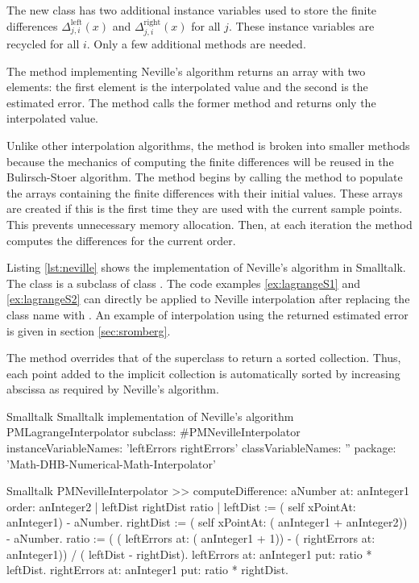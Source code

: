 The new class has two additional instance variables used to store
the finite differences $\Delta_{j,i}^{\mathop{
left}}\left(x\right)$ and $\Delta_{j,i}^{\mathop{
right}}\left(x\right)$ for all $j$.
These instance variables are recycled for all $i$.
Only a few additional methods are needed.

The method  implementing Neville's algorithm
returns an array with two elements: the first element is the
interpolated value and the second is the estimated error. The
method  calls the former method and returns only the
interpolated value.

Unlike other interpolation algorithms, the method  is broken into smaller methods because the
mechanics of computing the finite differences will be reused in
the Bulirsch-Stoer algorithm. The method 
begins by calling the method  to
populate the arrays containing the finite differences with their
initial values. These arrays are created if this is the first time
they are used with the current sample points. This prevents
unnecessary memory allocation. Then, at each iteration the method  computes the differences for the current order.

Listing \ref{lst:neville} shows the implementation of Neville's
algorithm in Smalltalk. The class  is
a subclass of class . The code
examples \ref{ex:lagrangeS1} and \ref{ex:lagrangeS2} can directly
be applied to Neville interpolation after replacing the class name
 with .
An example of interpolation using the returned estimated error is
given in section \ref{sec:sromberg}.

The method  overrides that of the
superclass to return a sorted collection. Thus, each point added
to the implicit collection is automatically sorted by increasing
abscissa as required by Neville's algorithm.

\begin{listing}[label=lst:neville]{Smalltalk}
{Smalltalk implementation of Neville's algorithm}
PMLagrangeInterpolator subclass: #PMNevilleInterpolator
   instanceVariableNames: 'leftErrors rightErrors'
   classVariableNames: ''
   package: 'Math-DHB-Numerical-Math-Interpolator'
\end{listing}

\begin{displaycode}{Smalltalk}
PMNevilleInterpolator >> computeDifference: aNumber at: anInteger1 order: anInteger2
    | leftDist rightDist ratio |
    leftDist := ( self xPointAt: anInteger1) - aNumber.
    rightDist := (  self xPointAt: ( anInteger1 + anInteger2)) - 
                                                              aNumber.
    ratio := ( ( leftErrors at: ( anInteger1 + 1)) - ( rightErrors 
                           at: anInteger1)) / ( leftDist - rightDist).
    leftErrors at: anInteger1 put: ratio * leftDist.
    rightErrors at: anInteger1 put: ratio * rightDist.
\end{displaycode}

